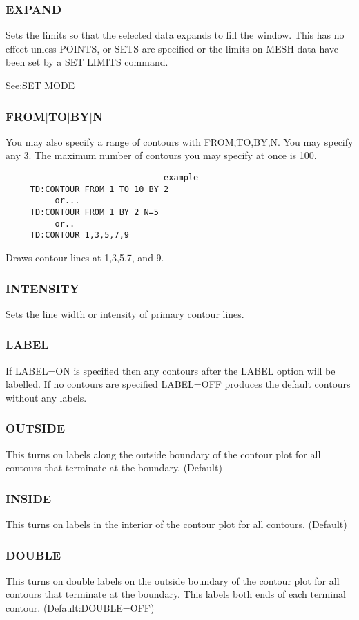 \subsubsection{EXPAND}
Sets  the  limits so that the selected data expands to fill the window.
This has no effect unless POINTS, or SETS are specified or  the  limits
on MESH data have been set by a SET LIMITS command.  

See:SET MODE 
\subsubsection{FROM$|$TO$|$BY$|$N}
You  may  also  specify a range of contours with FROM,TO,BY,N.  You may
specify any 3.  The maximum number of contours you may specify at  once
is 100.  

\begin{verbatim}
                                example
     TD:CONTOUR FROM 1 TO 10 BY 2 
          or...  
     TD:CONTOUR FROM 1 BY 2 N=5 
          or..  
     TD:CONTOUR 1,3,5,7,9 
\end{verbatim}
Draws contour lines at 1,3,5,7, and 9.  
\subsubsection{INTENSITY}
Sets the line width or intensity of primary contour lines.  
\subsubsection{LABEL}
If  LABEL=ON is specified then any contours after the LABEL option will
be labelled.  If no  contours  are  specified  LABEL=OFF  produces  the
default contours without any labels.  
\subsubsection{OUTSIDE}
This turns on labels along the outside boundary of the contour plot for
all contours that terminate at the boundary.  (Default) 
\subsubsection{INSIDE}
This  turns  on  labels  in  the  interior  of the contour plot for all
contours.  (Default) 
\subsubsection{DOUBLE}
This turns on double labels on the outside boundary of the contour plot
for all contours that terminate at the boundary.  This labels both ends
of each terminal contour.  
(Default:DOUBLE=OFF) 
